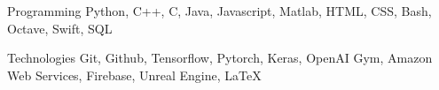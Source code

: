 

\begin{cvskills}

  \cvskill
    {Programming} %
    {Python, C++, C, Java, Javascript, Matlab, HTML, CSS, Bash, Octave, Swift, SQL} %

\cvskill
{Technologies} %
{Git, Github, Tensorflow, Pytorch, Keras, OpenAI Gym, Amazon Web Services, Firebase, Unreal Engine, LaTeX} %


\end{cvskills}

